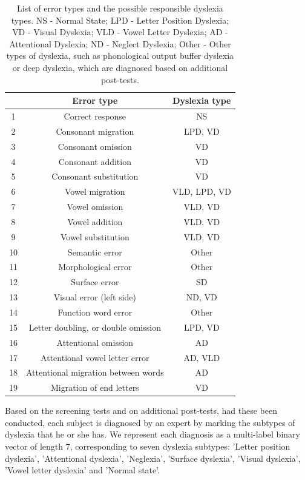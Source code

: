 \begin{table}

\caption{List of error types and the possible responsible dyslexia types. NS - Normal State; LPD - Letter Position Dyslexia; VD - Visual Dyslexia; VLD - Vowel Letter Dyslexia; AD - Attentional Dyslexia; ND - Neglect Dyslexia; Other - Other types of dyslexia, such as phonological output buffer dyslexia or deep dyslexia, which are diagnosed based on additional post-tests.}

\centering
\begin{tabular}{|c|c|c|} \hline

& Error type & Dyslexia type\\
\hline
1 & Correct response & NS\\
2 & Consonant migration & LPD, VD\\
3 & Consonant omission & VD\\
4 & Consonant addition & VD\\
5 & Consonant substitution & VD\\
6 & Vowel migration & VLD, LPD, VD\\
7 & Vowel omission & VLD, VD\\
8 & Vowel addition & VLD, VD\\
9 & Vowel substitution & VLD, VD\\
10 & Semantic error & Other\\
11 & Morphological error & Other\\
12 & Surface error & SD\\
13 & Visual error (left side) & ND, VD\\
14 & Function word error & Other\\
15 & Letter doubling, or double omission & LPD, VD\\
16 & Attentional omission & AD\\
17 & Attentional vowel letter error & AD, VLD\\
18 & Attentional migration between words & AD\\
19 & Migration of end letters & VD\\

\hline\end{tabular}

\bigskip
\end{table}

Based on the screening tests and on additional post-tests, had these been conducted, each subject is diagnosed by an expert by marking the subtypes of dyslexia that he or she has. We represent each diagnosis as a multi-label binary vector of length 7, corresponding to seven dyslexia subtypes: 'Letter position dyslexia', 'Attentional dyslexia', 'Neglexia', 'Surface dyslexia', 'Visual dyslexia', 'Vowel letter dyslexia' and 'Normal state'.

